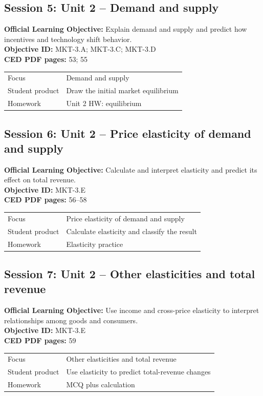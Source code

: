 \documentclass[11pt,a4paper]{article}
\newcommand{\objectivebox}[1]{\noindent\colorbox{aplight}{\parbox{0.96\textwidth}{#1}}}
\begin{document}
\subsection{Session 5: Unit 2 -- Demand and supply}
\objectivebox{\textbf{Official Learning Objective:} Explain demand and supply and predict how incentives and technology shift behavior.\\\textbf{Objective ID:} MKT-3.A; MKT-3.C; MKT-3.D\\\textbf{CED PDF pages:} 53; 55}\par\vspace{0.4em}
\begin{tabularx}{\textwidth}{p{3.0cm}Y}
\toprule
Focus & Demand and supply\\
Student product & Draw the initial market equilibrium\\
Homework & Unit 2 HW: equilibrium\\
\bottomrule
\end{tabularx}
\subsection{Session 6: Unit 2 -- Price elasticity of demand and supply}
\objectivebox{\textbf{Official Learning Objective:} Calculate and interpret elasticity and predict its effect on total revenue.\\\textbf{Objective ID:} MKT-3.E\\\textbf{CED PDF pages:} 56–58}\par\vspace{0.4em}
\begin{tabularx}{\textwidth}{p{3.0cm}Y}
\toprule
Focus & Price elasticity of demand and supply\\
Student product & Calculate elasticity and classify the result\\
Homework & Elasticity practice\\
\bottomrule
\end{tabularx}
\newpage
\subsection{Session 7: Unit 2 -- Other elasticities and total revenue}
\objectivebox{\textbf{Official Learning Objective:} Use income and cross-price elasticity to interpret relationships among goods and consumers.\\\textbf{Objective ID:} MKT-3.E\\\textbf{CED PDF pages:} 59}\par\vspace{0.4em}
\begin{tabularx}{\textwidth}{p{3.0cm}Y}
\toprule
Focus & Other elasticities and total revenue\\
Student product & Use elasticity to predict total-revenue changes\\
Homework & MCQ plus calculation\\
\bottomrule
\end{tabularx}
\end{document}
